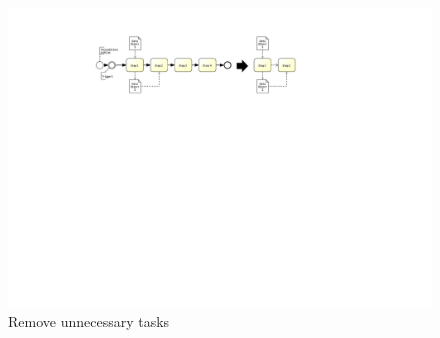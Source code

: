 \begin{figure}[h!]
	\includegraphics[width=\textwidth, trim={7.5cm 15.3cm 8.5cm 1.5cm}]{img/ExtractDFDRemove.pdf}
	\caption{Remove unnecessary tasks}
	\label{fig:removeDataFlow}
\end{figure}



\pagebreak







\pagebreak



